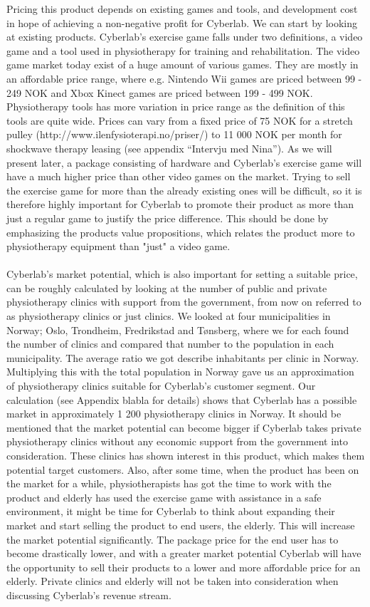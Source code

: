 Pricing this product depends on existing games and tools, and development cost in hope of achieving a non-negative profit for Cyberlab. We can start by looking at existing products. Cyberlab's exercise game falls under two definitions, a video game and a tool used in physiotherapy for training and rehabilitation. The video game market today exist of a huge amount of various games. They are mostly in an affordable price range, where e.g. Nintendo Wii games are priced between 99 - 249 NOK and Xbox Kinect games are priced between 199 - 499 NOK. Physiotherapy tools has more variation in price range as the definition of this tools are quite wide. Prices can vary from a fixed price of 75 NOK for a stretch pulley (http://www.ilenfysioterapi.no/priser/)  to 11 000 NOK per month for shockwave therapy leasing (see appendix “Intervju med Nina”). As we will present later, a package consisting of hardware and Cyberlab’s exercise game will have a much higher price than other video games on the market. Trying to sell the exercise game for more than the already existing ones will be difficult, so it is therefore highly important for Cyberlab to promote their product as more than just a regular game to justify the price difference. This should be done by emphasizing the products value propositions, which relates the product more to physiotherapy equipment than "just" a video game. \\ \\
Cyberlab’s market potential, which is also important for setting a suitable price, can be roughly calculated by looking at the number of public and private physiotherapy clinics with support from the government, from now on referred to as physiotherapy clinics or just clinics. We looked at four municipalities in Norway; Oslo, Trondheim, Fredrikstad and T{ø}nsberg, where we for each found the number of clinics and compared that number to the population in each municipality. The average ratio we got describe inhabitants per clinic in Norway. Multiplying this with the total population in Norway gave us an approximation of physiotherapy clinics suitable for Cyberlab's customer segment. Our calculation (see Appendix blabla for details) shows that Cyberlab has a possible market in approximately 1 200 physiotherapy clinics in Norway. It should be mentioned that the market potential can become bigger if Cyberlab takes private physiotherapy clinics without any economic support from the government into consideration. These clinics has shown interest in this product, which makes them potential target customers. Also, after some time, when the product has been on the market for a while, physiotherapists has got the time to work with the product and elderly has used the exercise game with assistance in a safe environment, it might be time for Cyberlab to think about expanding their market and start selling the product to end users, the elderly. This will increase the market potential significantly. The package price for the end user has to become drastically lower, and with a greater market potential Cyberlab will have the opportunity to sell their products to a lower and more affordable price for an elderly. Private clinics and elderly will not be taken into consideration when discussing Cyberlab's revenue stream.\\ \\

